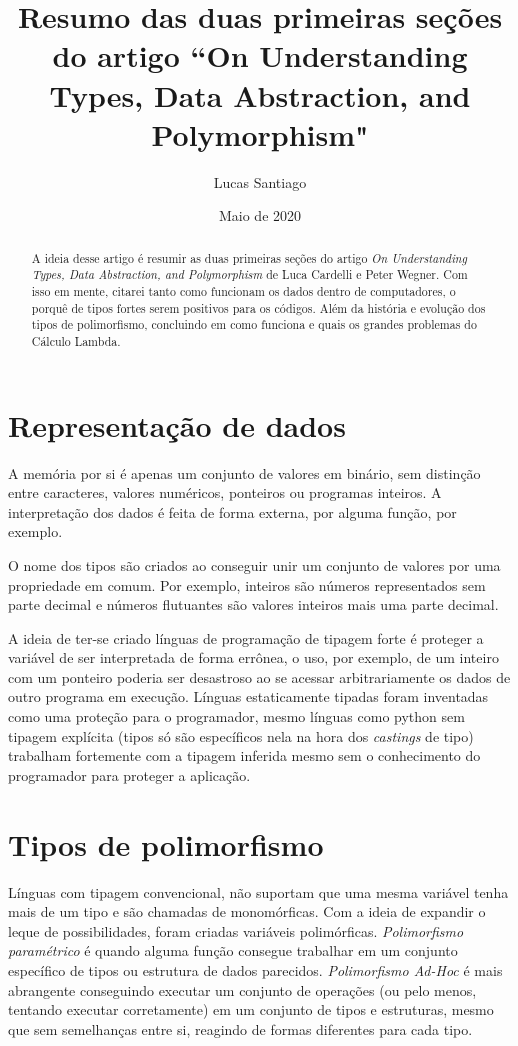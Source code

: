\documentclass{article}
\title{Resumo das duas primeiras seções do artigo ``On Understanding Types, Data Abstraction, and Polymorphism"}
\author{Lucas Santiago}
\date{Maio de 2020}
\begin{document}
\maketitle


\begin{abstract}
    A ideia desse artigo é resumir as duas primeiras seções do artigo \emph{On Understanding Types, Data Abstraction, and Polymorphism} de Luca Cardelli e Peter Wegner. Com isso em mente, citarei tanto como funcionam os dados dentro de computadores, o porquê de tipos fortes serem positivos para os códigos. Além da história e evolução dos tipos de polimorfismo, concluindo em como funciona e quais os grandes problemas do Cálculo Lambda.     
\end{abstract}



\section{Representação de dados}

\hspace{10pt} A memória por si é apenas um conjunto de valores em binário, sem distinção entre caracteres, valores numéricos, ponteiros ou programas inteiros. A interpretação dos dados é feita de forma externa, por alguma função, por exemplo.

O nome dos tipos são criados ao conseguir unir um conjunto de valores por uma propriedade em comum. Por exemplo, inteiros são números representados sem parte decimal e números flutuantes são valores inteiros mais uma parte decimal.

A ideia de ter-se criado línguas de programação de tipagem forte é proteger a variável de ser interpretada de forma errônea, o uso, por exemplo, de um inteiro com um ponteiro poderia ser desastroso ao se acessar arbitrariamente os dados de outro programa em execução. 
Línguas estaticamente tipadas foram inventadas como uma proteção para o programador, mesmo línguas como python sem tipagem explícita (tipos só são específicos nela na hora dos \emph{castings} de tipo) trabalham fortemente com a tipagem inferida mesmo sem o conhecimento do programador para proteger a aplicação.

\section{Tipos de polimorfismo}

\hspace{10pt} Línguas com tipagem convencional, não suportam que uma mesma variável tenha mais de um tipo e são chamadas de monomórficas. Com a ideia de expandir o leque de possibilidades, foram criadas variáveis polimórficas. \emph{Polimorfismo paramétrico} é quando alguma função consegue trabalhar em um conjunto específico de tipos ou estrutura de dados parecidos. \emph{Polimorfismo Ad-Hoc} é mais abrangente conseguindo executar um conjunto de operações (ou pelo menos, tentando executar corretamente) em um conjunto de tipos e estruturas, mesmo que sem semelhanças entre si, reagindo de formas diferentes para cada tipo.
\end{document}
